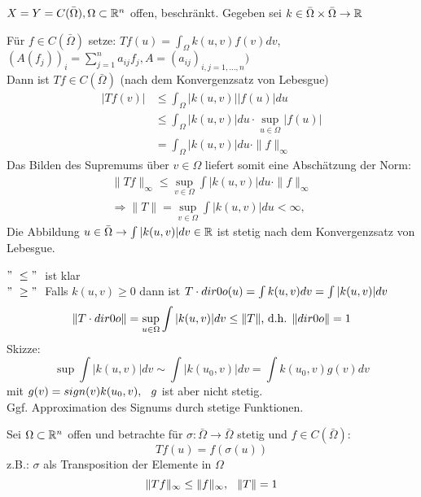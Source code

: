 \begin{beispiel}[Integraloperator] 
	$X = Y = C(\bar \Omega), \Omega \subset \mathbb{R}^{n}$ offen, beschränkt.
	Gegeben sei $k \in \bar \Omega \times \bar \Omega \rightarrow \mathbb{R} $
	
	Für $f \in C(\bar \Omega)$ setze: $Tf(u) = \int_{\Omega} k(u, v) f(v) dv$, \hspace{0.25cm}
	$\left( A( f_{j} ) \right)_{i} = \sum_{j = 1}^{n} a_{ij}f_{j}, A = (a_{ij})_{i,j = 1, \dotsc, n} )$ \\
	
	Dann ist $Tf \in C(\bar \Omega)$ (nach dem Konvergenzsatz von Lebesgue)
	\begin{align*}
		|T f(v)| & \leq \int_{\Omega} |k(u, v)| |f(u)| du \\
				 & \leq \int_{\Omega} |k(u, v)| du \cdot \sup_{u \in \Omega} | f(u) | \\
				 & = \int_{\Omega} |k(u, v)| du \cdot \| f \|_{\infty}
	\end{align*} 				 
	Das Bilden des Supremums über $v \in \Omega$ liefert somit eine Abschätzung der Norm:
	\begin{align*}
		\| Tf \|_{\infty} \leq \sup_{v \in \Omega} \int |k(u,v)| du \cdot \| f \|_{\infty} \\
		\Rightarrow \| T \| = \sup_{v \in \Omega} \int |k(u, v)| du < \infty,
	\end{align*} 	
	Die Abbildung $u \in \bar \Omega \rightarrow \int |k(u, v)| dv \in \mathbb{R}$ ist stetig nach dem Konvergenzsatz von Lebesgue. \\
	\begin{beweis}
		$ "\ \leq "\ $ ist klar \\
		$ "\ \geq "\ $ Falls $ k(u, v) \geq 0$ dann ist $T \cdot \1 (u) = \int k(u, v) dv = \int |k(u, v)| dv$ \\
		\[ \| T \cdot \1 \| = \sup_{u \in \Omega} \int |k(u, v)| dv \leq \| T \| \text{, d.h. } \| \1 \| = 1 \]
		Skizze:
		\[ \sup \int | k(u, v) | dv \sim \int | k(u_{0}, v) | dv = \int k(u_{0}, v) g(v) dv \]
		mit $g(v) = sign(v) k(u_{0}, v), \hspace{0.25cm} g$ ist aber nicht stetig. \\
		Ggf. Approximation des Signums durch stetige Funktionen.
	\end{beweis}
\end{beispiel}


\begin{beispiel}[Kompositionsoperator] 
Sei $\Omega \subset \mathbb{R}^{n}$ offen und betrachte für $\sigma \colon \bar \Omega \rightarrow \bar \Omega$ stetig und $f \in C(\bar \Omega)$:
	\[ Tf(u) = f(\sigma(u)) \]
z.B.: $\sigma$ als Transposition der Elemente in $\Omega$
\[ \| Tf \|_{\infty} \leq \| f \|_{\infty}, \hspace{0.25cm} \| T \| = 1 \]
\end{beispiel}

